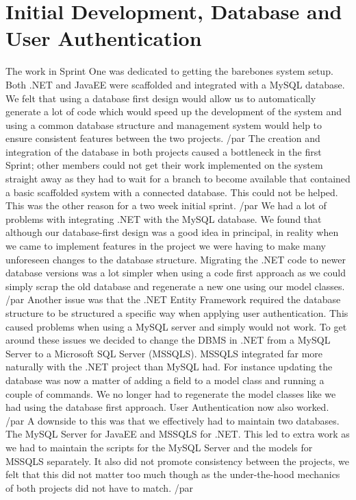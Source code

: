 \section{Initial Development, Database and User Authentication}
The work in Sprint One was dedicated to getting the barebones system setup. Both .NET and JavaEE were scaffolded and integrated with a MySQL database. We felt that using a database first design would allow us to automatically generate a lot of code which would speed up the development of the system and using a common database structure and management system would help to ensure consistent features between the two projects. /par
The creation and integration of the database in both projects caused a bottleneck in the first Sprint; other members could not get their work implemented on the system straight away as they had to wait for a branch to become available that contained a basic scaffolded system with a connected database. This could not be helped. This was the other reason for a two week initial sprint. /par
We had a lot of problems with integrating .NET with the MySQL database. We found that although our database-first design was a good idea in principal, in reality when we came to implement features in the project we were having to make many unforeseen changes to the database structure. Migrating the .NET code to newer database versions was a lot simpler when using a code first approach as we could simply scrap the old database and regenerate a new one using our model classes. /par
Another issue was that the .NET Entity Framework required the database structure to be structured a specific way when applying user authentication. This caused problems when using a MySQL server and simply would not work. To get around these issues we decided to change the DBMS in .NET from a MySQL Server to a Microsoft SQL Server (MSSQLS). MSSQLS integrated far more naturally with the .NET project than MySQL had. For instance updating the database was now a matter of adding a field to a model class and running a couple of commands. We no longer had to regenerate the model classes like we had using the database first approach. User Authentication now also worked. /par
A downside to this was that we effectively had to maintain two databases. The MySQL Server for JavaEE and MSSQLS for .NET. This led to extra work as we had to maintain the scripts for the MySQL Server and the models for MSSQLS separately. It also did not promote consistency between the projects, we felt that this did not matter too much though as the under-the-hood mechanics of both projects did not have to match. /par
